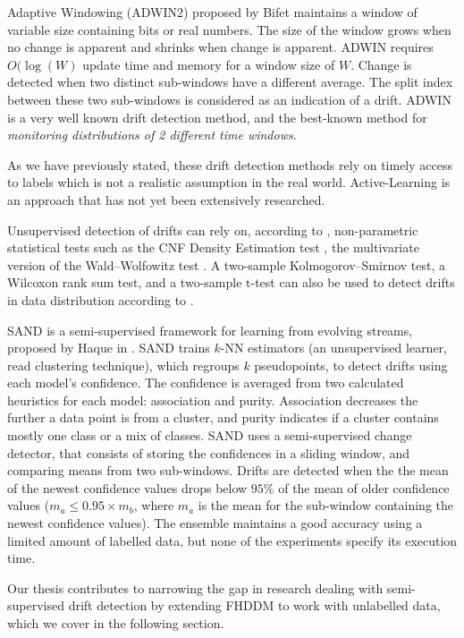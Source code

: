 Adaptive Windowing (ADWIN2) proposed by Bifet \cite{bifet2007learning} maintains a window of variable size containing bits or real numbers. The size of the window grows when no change is apparent and shrinks when change is apparent. ADWIN requires $O(\log(W)$ update time and memory for a window size of $W$. Change is detected when two distinct sub-windows have a different average. The split index between these two sub-windows is considered as an indication of a drift. ADWIN is a very well known drift detection method, and the best-known method for \textit{monitoring distributions of 2 different time windows}.

As we have previously stated, these drift detection methods rely on timely access to labels which is not a realistic assumption in the real world.  Active-Learning is an approach that has not yet been extensively researched.

Unsupervised detection of drifts can rely on, according to \cite{sobolewski2013concept}, non-parametric statistical tests such as the CNF Density Estimation test \cite{dries2009adaptive}, the multivariate version of the Wald–Wolfowitz test \cite{friedman1979multivariate}.
A two-sample Kolmogorov–Smirnov test, a Wilcoxon rank sum test, and a two-sample t-test can also be used to detect drifts in data distribution according to \cite{sheskin2003handbook, sobolewski2013concept}.

\label{paragraph:SAND}SAND is a semi-supervised framework for learning from evolving streams, proposed by Haque in \cite{haque2015sand}. SAND trains $k$-NN estimators (an unsupervised learner, read clustering technique), which regroups $k$ pseudopoints, to detect drifts using each model's confidence. The confidence is averaged from two calculated heuristics for each model: association and purity. Association decreases the further a data point is from a cluster, and purity indicates if a cluster contains mostly one class or a mix of classes. SAND uses a semi-supervised change detector, that consists of storing the confidences in a sliding window, and comparing means from two sub-windows. Drifts are detected when the the mean of the newest confidence values drops below $95\%$ of the mean of older confidence values ($m_a \leq 0.95\times m_b$, where $m_a$ is the mean for the sub-window containing the newest confidence values). The ensemble maintains a good accuracy using a limited amount of labelled data, but none of the experiments specify its execution time.

Our thesis contributes to narrowing the gap in research dealing with semi-supervised drift detection by extending FHDDM to work with unlabelled data, which we cover in the following section.

